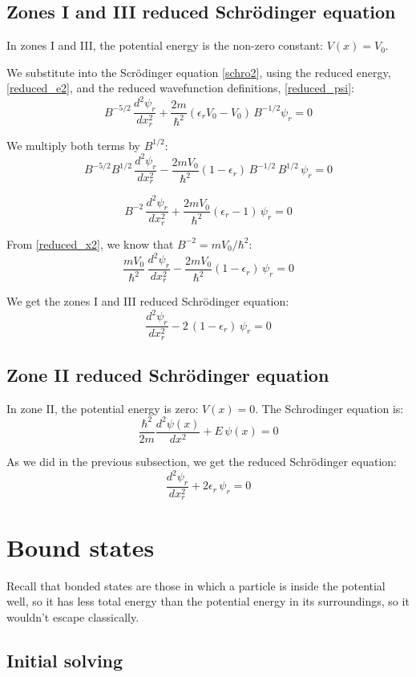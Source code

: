 \subsection{Zones I and III reduced Schrödinger equation}
In zones I and III, the potential energy is the non-zero constant: $V(x) = V_0$.

We substitute into the Scrödinger equation \ref{schro2}, using the reduced
energy, \ref{reduced_e2}, and the reduced wavefunction definitions,
\ref{reduced_psi}:
\[
B^{-5/2}\,\frac{d^2\psi_r}{dx_r^2}
	 + \frac{2m}{\hbar^2}(\epsilon_rV_0-V_0)\,B^{-1/2}\psi_r=0
\]

We multiply both terms by $B^{1/2}$:
\[
B^{-5/2}B^{1/2}\,\frac{d^2\psi_r}{dx_r^2}
	 - \frac{2mV_0}{\hbar^2}(1-\epsilon_r)\,B^{-1/2}\,B^{1/2}\,\psi_r=0
\]

\[
B^{-2}\,\frac{d^2\psi_r}{dx_r^2}
	 + \frac{2mV_0}{\hbar^2}(\epsilon_r-1)\,\psi_r=0
\]

From \ref{reduced_x2}, we know that $B^{-2}=mV_0/\hbar^2$:
\[
\frac{mV_0}{\hbar^2}\,\frac{d^2\psi_r}{dx_r^2}
	 - \frac{2mV_0}{\hbar^2}(1-\epsilon_r)\,\psi_r=0
\]

We get the zones I and III reduced Schrödinger equation:
\begin{equation}
\frac{d^2\psi_r}{dx_r^2} - 2\,(1-\epsilon_r)\,\psi_r=0
\end{equation}

\subsection{Zone II reduced Schrödinger equation}
In zone II, the potential energy is zero: $V(x) = 0$.
The Schrodinger equation is:
\[
\label{schro2}
\frac{\hbar^2}{2m}\frac{d^2\psi(x)}{dx^2} + E\,\psi(x) = 0
\]

As we did in the previous subsection, we get the reduced Schrödinger equation:
\begin{equation}
\frac{d^2\psi_r}{dx_r^2} + 2\epsilon_r\,\psi_r=0
\end{equation}


\section{Bound states}
Recall that bonded states are those in which a particle is inside the
potential well, so it has less total energy than the potential energy in its
surroundings, so it wouldn't escape classically.

\subsection{Initial solving}
